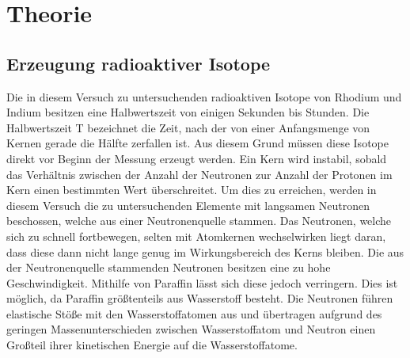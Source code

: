 
\section{Theorie}
%
\subsection{Erzeugung radioaktiver Isotope}
%
Die in diesem Versuch zu untersuchenden radioaktiven Isotope von Rhodium und Indium besitzen eine Halbwertszeit von einigen Sekunden bis Stunden. Die Halbwertszeit T bezeichnet die Zeit, nach der von einer Anfangsmenge von Kernen gerade die Hälfte zerfallen ist. Aus diesem Grund müssen diese Isotope direkt vor Beginn der Messung erzeugt werden.
Ein Kern wird instabil, sobald das Verhältnis zwischen der Anzahl der Neutronen zur Anzahl der Protonen im Kern einen bestimmten Wert überschreitet. Um dies zu erreichen, werden in diesem Versuch die zu untersuchenden Elemente mit langsamen Neutronen beschossen, welche aus einer Neutronenquelle stammen.
Das Neutronen, welche sich zu schnell fortbewegen, selten mit Atomkernen wechselwirken liegt daran, dass diese dann nicht lange genug im Wirkungsbereich des Kerns bleiben. 
Die aus der Neutronenquelle stammenden Neutronen besitzen eine zu hohe Geschwindigkeit. Mithilfe von Paraffin lässt sich diese jedoch verringern. Dies ist möglich, da Paraffin größtenteils aus Wasserstoff besteht. Die Neutronen führen elastische Stöße mit den Wasserstoffatomen aus und übertragen aufgrund des geringen Massenunterschieden zwischen Wasserstoffatom und Neutron einen Großteil ihrer kinetischen Energie auf die Wasserstoffatome.
%
